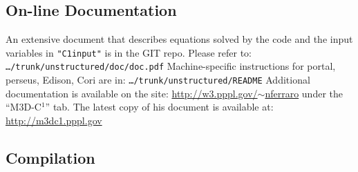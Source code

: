 \subsection{On-line Documentation}
An extensive document that describes equations solved by the code and the input variables in \texttt{"C1input"} is in the GIT repo. Please refer to: \texttt{\ldots/trunk/unstructured/doc/doc.pdf}
\newline\newline
Machine-specific instructions for portal, perseus, Edison, Cori are in:  
\texttt{\ldots/trunk/unstructured/README}
\newline\newline
Additional documentation is available on the site: \href{http://w3.pppl.gov/~nferraro}{http://w3.pppl.gov/$\sim$nferraro} under the ``M3D-C$^{1}$'' tab.
\newline\newline
The latest copy of his document is available at: \href{http://m3dc1.pppl.gov}{http://m3dc1.pppl.gov}

\subsection{Compilation}

